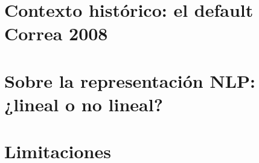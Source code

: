 \section{Contexto histórico: el default Correa 2008}

\section{Sobre la representación NLP: ¿lineal o no lineal?}

\section{Limitaciones}
